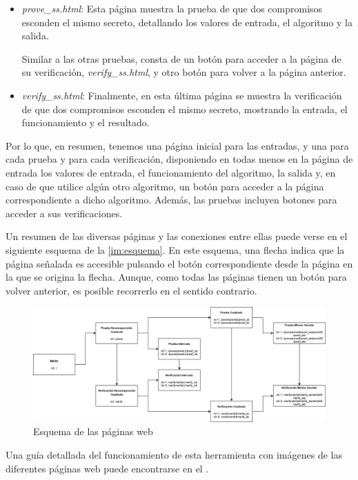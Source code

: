 \begin{itemize}
    \item \emph{prove\_ss.html}: Esta página muestra la prueba de que dos compromisos esconden el mismo secreto, detallando los valores de entrada, el algoritmo y la salida.

    Similar a las otras pruebas, consta de un botón para acceder a la página de su verificación, \emph{verify\_ss.html}, y otro botón para volver a la página anterior.

    \item \emph{verify\_ss.html}: Finalmente, en esta última página se muestra la verificación de que dos compromisos esconden el mismo secreto, mostrando la entrada, el funcionamiento y el resultado.
\end{itemize}

Por lo que, en resumen, tenemos una página inicial para las entradas, y una para cada prueba y para cada verificación, disponiendo en todas menos en la página de entrada los valores de entrada, el funcionamiento del algoritmo, la salida y, en caso de que utilice algún otro algoritmo, un botón para acceder a la página correspondiente a dicho algoritmo. Además, las pruebas incluyen botones para acceder a sus verificaciones.

Un resumen de las diversas páginas y las conexiones entre ellas puede verse en el siguiente esquema de la \autoref{im:esquema}. En este esquema, una flecha indica que la página señalada es accesible pulsando el botón correspondiente desde la página en la que se origina la flecha. Aunque, como todas las páginas tienen un botón para volver anterior, es posible recorrerlo en el sentido contrario.
\begin{figure}
    \centering
    \includegraphics[width=\columnwidth]{images/Esquema.png}
    \caption{Esquema de las páginas web}
    \label{im:esquema}
\end{figure}

Una guía detallada del funcionamiento de esta herramienta con imágenes de las diferentes páginas web puede encontrarse en el .

